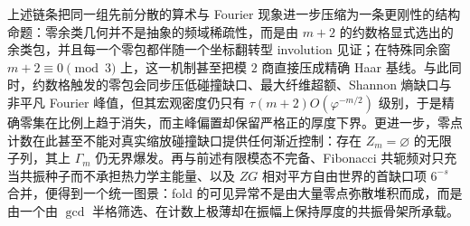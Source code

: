 


\noindent
上述链条把同一组先前分散的算术与 Fourier 现象进一步压缩为一条更刚性的结构命题：零余类几何并不是抽象的频域稀疏性，而是由 \(m+2\) 的约数格显式选出的余类包，并且每一个零包都伴随一个坐标翻转型 involution 见证；在特殊同余窗 \(m+2\equiv 0\pmod 3\) 上，这一机制甚至把模 \(2\) 商直接压成精确 Haar 基线。与此同时，约数格触发的零包会同步压低碰撞缺口、最大纤维超额、Shannon 熵缺口与非平凡 Fourier 峰值，但其宏观密度仍只有 \(\tau(m+2)O(\varphi^{-m/2})\) 级别，于是精确零集在比例上趋于消失，而主峰偏置却保留严格正的厚度下界。更进一步，零点计数在此甚至不能对真实缩放碰撞缺口提供任何渐近控制：存在 \(Z_m=\varnothing\) 的无限子列，其上 \(\Gamma_m\) 仍无界爆发。再与前述有限模态不完备、Fibonacci 共轭频对只充当共振种子而不承担热力学主能量、以及 \(ZG\) 相对平方自由世界的首缺口项 \(6^{-s}\) 合并，便得到一个统一图景：fold 的可见异常不是由大量零点弥散堆积而成，而是由一个由 \(\gcd\) 半格筛选、在计数上极薄却在振幅上保持厚度的共振骨架所承载。

\endinput
